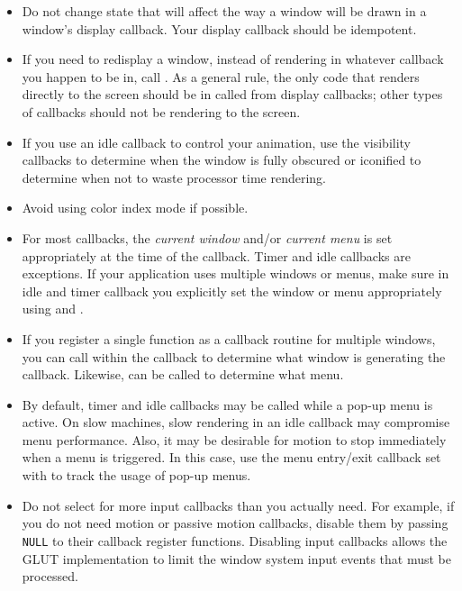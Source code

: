 \begin{itemize}

\item
Do not change state that will affect the way a window
will be drawn in a window's display callback.
Your display callback should be idempotent.

\item
If you need to redisplay a window, instead of rendering in
whatever callback you happen to be in, call .
As a general rule, the only code that renders directly to the screen
should be in called from display callbacks; other types of callbacks
should not be rendering to the screen.

\item
If you use an idle callback to control your animation, use the
visibility callbacks to determine when the window is fully obscured
or iconified to determine when not to waste processor time rendering.

\item
Avoid using color index mode if possible.

\item
For most callbacks, the {\em current window} and/or {\em current menu} is
set appropriately at the time of the callback.  Timer and idle callbacks
are exceptions.  If your application uses multiple windows or menus,
make sure in idle and timer callback you explicitly set the
window or menu appropriately using  and .

\item
If you register a single function as a callback routine for multiple
windows, you can call  within the callback to
determine what window is generating the callback.  Likewise,  can be called to determine what menu.

\item
By default, timer and idle callbacks may be called while a
pop-up menu is active.  On slow machines, slow rendering in an idle
callback may compromise menu performance.  Also, it may be desirable
for motion to stop immediately when a menu is triggered.  In this
case, use the menu entry/exit callback set with 
to track the usage of pop-up menus.

\item
Do not select for more input callbacks than you actually
need.  For example, if you do not need motion or passive motion
callbacks, disable them by passing {\tt NULL} to their callback
register functions.  Disabling input callbacks allows the GLUT
implementation to limit the window system input events that must
be processed.


\end{itemize}
